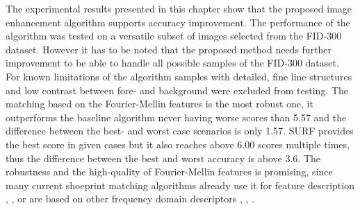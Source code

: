 \documentclass[draft,final]{vutinfth} %
\begin{document}
\par
The experimental results presented in this chapter show that the proposed image enhancement algorithm supports accuracy improvement.
The performance of the algorithm was tested on a versatile subset of images selected from the FID-300 dataset.
However it has to be noted that the proposed method needs further improvement to be able to handle all possible samples of the FID-300 dataset.
For known limitations of the algorithm samples with detailed, fine line structures and low contrast between fore- and background were excluded from testing.
The matching based on the Fourier-Mellin features is the most robust one, it outperforms the baseline algorithm never having worse scores than 5.57 and the difference between the best- and worst case scenarios is only 1.57.
SURF provides the best score in given cases but it also reaches above 6.00 scores multiple times, thus the difference between the best and worst accuracy is above 3.6.
The robustness and the high-quality of Fourier-Mellin features is promising, since many current shoeprint matching algorithms already use it for feature description  \cite{gueham2008automatic}, \cite{richetelli2017classification}, \cite{wu2019crime} or are based on other frequency domain descriptors \cite{algarni2008novel}, \cite{wang2014automatic}, \cite{katireddy2017novel}.

\end{document}

